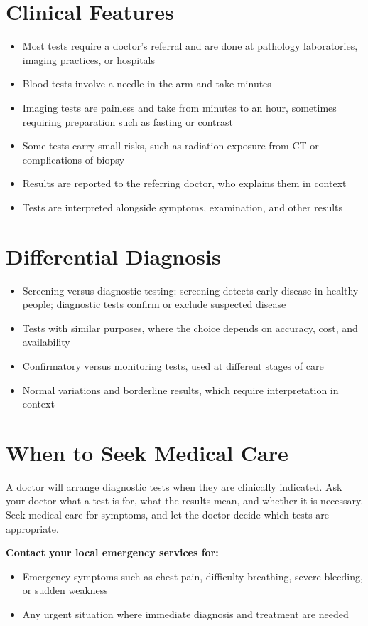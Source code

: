 \section*{Clinical Features}
\begin{itemize}
    \item Most tests require a doctor's referral and are done at pathology laboratories, imaging practices, or hospitals
    \item Blood tests involve a needle in the arm and take minutes
    \item Imaging tests are painless and take from minutes to an hour, sometimes requiring preparation such as fasting or contrast
    \item Some tests carry small risks, such as radiation exposure from CT or complications of biopsy
    \item Results are reported to the referring doctor, who explains them in context
    \item Tests are interpreted alongside symptoms, examination, and other results
\end{itemize}

\section*{Differential Diagnosis}
\begin{itemize}
    \item Screening versus diagnostic testing: screening detects early disease in healthy people; diagnostic tests confirm or exclude suspected disease
    \item Tests with similar purposes, where the choice depends on accuracy, cost, and availability
    \item Confirmatory versus monitoring tests, used at different stages of care
    \item Normal variations and borderline results, which require interpretation in context
\end{itemize}

\section*{When to Seek Medical Care}
A doctor will arrange diagnostic tests when they are clinically indicated. Ask your doctor what a test is for, what the results mean, and whether it is necessary. Seek medical care for symptoms, and let the doctor decide which tests are appropriate.

\textbf{Contact your local emergency services for:}
\begin{itemize}
    \item Emergency symptoms such as chest pain, difficulty breathing, severe bleeding, or sudden weakness
    \item Any urgent situation where immediate diagnosis and treatment are needed
\end{itemize}

